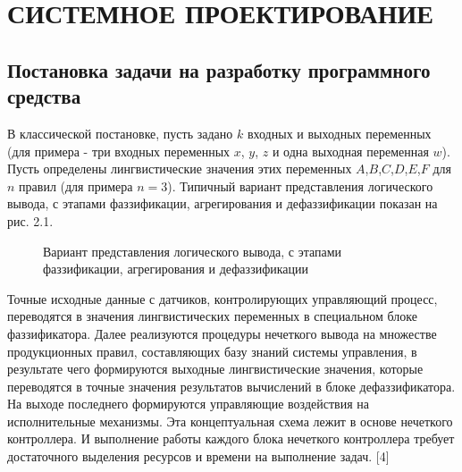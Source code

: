 \lstset{style=pythoninlinestyle}

\section{СИСТЕМНОЕ ПРОЕКТИРОВАНИЕ}
\label{sec:sys}

\subsection{Постановка задачи на разработку программного средства}
\label{sub:sys:1}

В классической постановке, пусть задано $k$ входных и выходных   переменных (для примера - три входных переменных $x$, $y$, $z$ и одна выходная переменная $w$). Пусть определены лингвистические значения этих переменных $A$,$B$,$C$,$D$,$E$,$F$ для $n$ правил (для примера $n=3$).  Типичный вариант представления логического вывода, с этапами фаззификации,  агрегирования и дефаззификации показан на рис. 2.1.

\begin{figure}[ht]
  \centering
  \caption{Вариант представления логического вывода, с этапами фаззификации,  агрегирования и дефаззификации }
  \label{fig:sys:1:1}
\end{figure}

Точные исходные данные с датчиков, контролирующих управляющий процесс, переводятся в значения лингвистических переменных в специальном блоке фаззификатора. Далее реализуются процедуры нечеткого вывода на множестве продукционных правил, составляющих базу знаний системы управления, в результате чего формируются выходные лингвистические значения, которые переводятся в точные значения результатов вычислений в блоке дефаззификатора. На выходе последнего формируются управляющие воздействия на исполнительные механизмы. Эта концептуальная схема лежит в основе нечеткого контроллера. И выполнение работы каждого блока нечеткого контроллера требует достаточного выделения ресурсов и времени на выполнение задач. [4]

